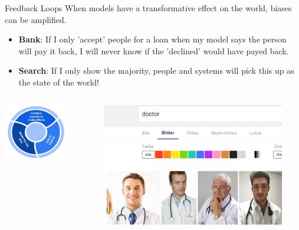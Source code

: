 \begin{vbframe}{Feedback Loops}
When models have a transformative effect on the world, biases can be amplified.

\begin{itemize}
   \item \textbf{Bank}: If I only 'accept' people for a loan when my model says the person will pay it back, I will never know if the 'declined' would have payed back.
   \item \textbf{Search}: If I only show the majority, people and systems will pick this up as the state of the world!
\end{itemize}





\begin{columns}
\begin{column}{0.5\textwidth}
    \begin{center}
     \includegraphics[width=0.7\textwidth]{figure_man/biases-loop.png}
     \end{center}
\end{column}
\begin{column}{0.5\textwidth}  %
    \begin{center}
     \includegraphics[width=0.9\textwidth]{figure_man/biases-google-doctor.png}
     \end{center}
\end{column}
\end{columns}





\end{vbframe}

